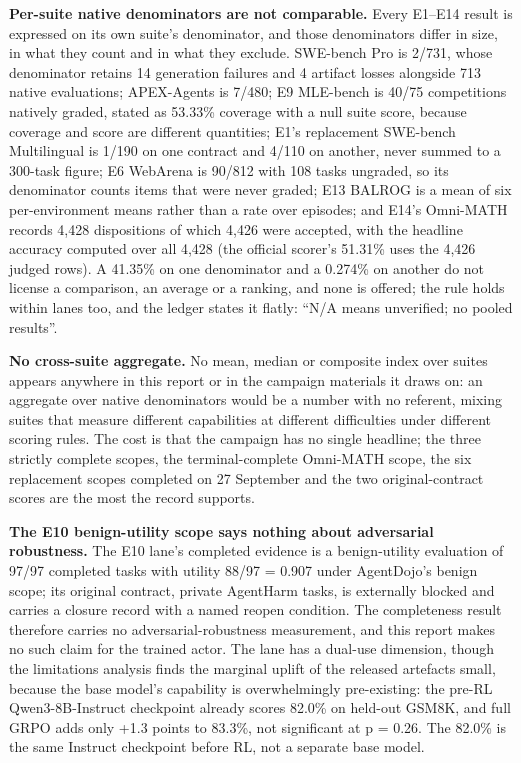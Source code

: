 \documentclass[12pt,a4paper]{report}
\begin{document}
\textbf{Per-suite native denominators are not comparable.} Every E1--E14
result is expressed on its own suite's denominator, and those
denominators differ in size, in what they count and in what they
exclude. SWE-bench Pro is 2/731, whose denominator retains 14 generation
failures and 4 artifact losses alongside 713 native evaluations;
APEX-Agents is 7/480; E9 MLE-bench is 40/75 competitions natively
graded, stated as 53.33\% coverage with a null suite score, because
coverage and score are different quantities; E1's replacement SWE-bench
Multilingual is 1/190 on one contract and 4/110 on another, never summed
to a 300-task figure; E6 WebArena is 90/812 with 108 tasks ungraded, so
its denominator counts items that were never graded; E13 BALROG is a
mean of six per-environment means rather than a rate over episodes; and
E14's Omni-MATH records 4,428 dispositions of which 4,426 were accepted,
with the headline accuracy computed over all 4,428 (the official
scorer's 51.31\% uses the 4,426 judged rows). A 41.35\% on one
denominator and a 0.274\% on another do not license a comparison, an
average or a ranking, and none is offered; the rule holds within lanes
too, and the ledger states it flatly: ``N/A means unverified; no pooled
results''.

\textbf{No cross-suite aggregate.} No mean, median or composite index
over suites appears anywhere in this report or in the campaign materials
it draws on: an aggregate over native denominators would be a number
with no referent, mixing suites that measure different capabilities at
different difficulties under different scoring rules. The cost is that
the campaign has no single headline; the three strictly complete scopes,
the terminal-complete Omni-MATH scope, the six replacement scopes
completed on 27 September and the two original-contract scores are the
most the record supports.

\textbf{The E10 benign-utility scope says nothing about adversarial
robustness.} The E10 lane's completed evidence is a benign-utility
evaluation of 97/97 completed tasks with utility 88/97 = 0.907 under
AgentDojo's benign scope; its original contract, private AgentHarm
tasks, is externally blocked and carries a closure record with a named
reopen condition. The completeness result therefore carries no
adversarial-robustness measurement, and this report makes no such claim
for the trained actor. The lane has a dual-use dimension, though the
limitations analysis finds the marginal uplift of the released artefacts
small, because the base model's capability is overwhelmingly
pre-existing: the pre-RL Qwen3-8B-Instruct checkpoint already scores
82.0\% on held-out GSM8K, and full GRPO adds only +1.3 points to 83.3\%,
not significant at p = 0.26. The 82.0\% is the same Instruct checkpoint
before RL, not a separate base model.
\end{document}
